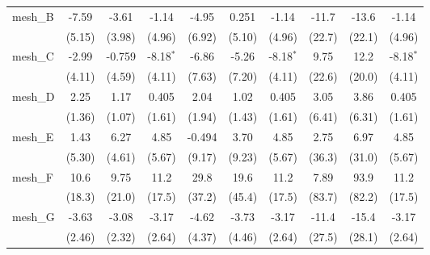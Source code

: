 \begin{tabular}{lccccccccc}
   mesh\_B                                                     & -7.59        & -3.61         & -1.14         & -4.95       & 0.251        & -1.14         & -11.7     & -13.6   & -1.14\\   
                                                               & (5.15)       & (3.98)        & (4.96)        & (6.92)      & (5.10)       & (4.96)        & (22.7)    & (22.1)  & (4.96)\\   
   mesh\_C                                                     & -2.99        & -0.759        & -8.18$^{*}$   & -6.86       & -5.26        & -8.18$^{*}$   & 9.75      & 12.2    & -8.18$^{*}$\\   
                                                               & (4.11)       & (4.59)        & (4.11)        & (7.63)      & (7.20)       & (4.11)        & (22.6)    & (20.0)  & (4.11)\\   
   mesh\_D                                                     & 2.25         & 1.17          & 0.405         & 2.04        & 1.02         & 0.405         & 3.05      & 3.86    & 0.405\\   
                                                               & (1.36)       & (1.07)        & (1.61)        & (1.94)      & (1.43)       & (1.61)        & (6.41)    & (6.31)  & (1.61)\\   
   mesh\_E                                                     & 1.43         & 6.27          & 4.85          & -0.494      & 3.70         & 4.85          & 2.75      & 6.97    & 4.85\\   
                                                               & (5.30)       & (4.61)        & (5.67)        & (9.17)      & (9.23)       & (5.67)        & (36.3)    & (31.0)  & (5.67)\\   
   mesh\_F                                                     & 10.6         & 9.75          & 11.2          & 29.8        & 19.6         & 11.2          & 7.89      & 93.9    & 11.2\\   
                                                               & (18.3)       & (21.0)        & (17.5)        & (37.2)      & (45.4)       & (17.5)        & (83.7)    & (82.2)  & (17.5)\\   
   mesh\_G                                                     & -3.63        & -3.08         & -3.17         & -4.62       & -3.73        & -3.17         & -11.4     & -15.4   & -3.17\\   
                                                               & (2.46)       & (2.32)        & (2.64)        & (4.37)      & (4.46)       & (2.64)        & (27.5)    & (28.1)  & (2.64)\\   

\end{tabular}
